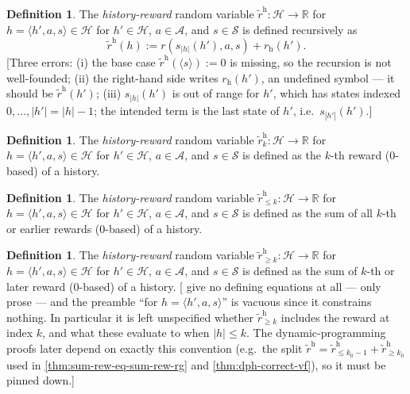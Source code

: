 \documentclass[letterpaper]{article}
\theoremstyle{plain}
\theoremstyle{definition}
\newtheorem{definition}[theorem]{Definition}
\theoremstyle{remark}
\newcommand{\Real}{\mathbb{R}}
\newcommand{\rew}{\tilde{r}^{\mathrm{h}}}
\newcommand{\cc}[1]{\textcolor{ccolor}{[#1]}}
\newcommand{\lean}[1]{\textcolor{blue}{(\emph{LEAN}: \texttt{#1})}}
\newcommand{\leanok}{}
\begin{document}
\begin{definition} \label{def:reward}
The \emph{history-reward} random variable $\rew\colon \mathcal{H} \to \Real$ for $h = \langle h', a, s \rangle \in  \mathcal{H}$ for $h'\in \mathcal{H}$, $a\in \mathcal{A}$, and $s\in \mathcal{S}$ is defined recursively as
\[
\rew(h) := r(s_{|h|}(h'), a, s) + r_{\mathrm{h}}(h').
\]
\cc{Three errors: (i) the base case $\rew(\langle s \rangle) := 0$ is missing, so the recursion is not well-founded; (ii) the right-hand side writes $r_{\mathrm{h}}(h')$, an undefined symbol --- it should be $\rew(h')$; (iii) $s_{|h|}(h')$ is out of range for $h'$, which has states indexed $0,\dots,|h'| = |h|-1$; the intended term is the last state of $h'$, i.e.\ $s_{|h'|}(h')$.}
\end{definition}

\begin{definition}\label{reward_at}
The \emph{history-reward} random variable $\rew_k \colon \mathcal{H} \to \Real$ for $h = \langle h', a, s \rangle \in  \mathcal{H}$ for $h'\in \mathcal{H}$, $a\in \mathcal{A}$, and $s\in \mathcal{S}$ is defined as the $k$-th reward (0-based) of a history.
\end{definition}

\begin{definition}\label{reward_to}
The \emph{history-reward} random variable $\rew_{\le k} \colon \mathcal{H} \to \Real$ for $h = \langle h', a, s \rangle \in  \mathcal{H}$ for $h'\in \mathcal{H}$, $a\in \mathcal{A}$, and $s\in \mathcal{S}$ is defined as the sum of all $k$-th or earlier rewards (0-based) of a history.
\end{definition}

\begin{definition}\label{reward_from}
The \emph{history-reward} random variable $\rew_{\ge k}\colon \mathcal{H} \to \Real$ for $h = \langle h', a, s \rangle \in  \mathcal{H}$ for $h'\in \mathcal{H}$, $a\in \mathcal{A}$, and $s\in \mathcal{S}$ is defined as the sum of $k$-th or later reward (0-based) of a history.
\cc{ give no defining equations at all --- only prose --- and the preamble ``for $h=\langle h',a,s\rangle$'' is vacuous since it constrains nothing. In particular it is left unspecified whether $\rew_{\ge k}$ includes the reward at index $k$, and what these evaluate to when $|h| \le k$. The dynamic-programming proofs later depend on exactly this convention (e.g.\ the split $\rew = \rew_{\le k_0-1} + \rew_{\ge k_0}$ used in \cref{thm:sum-rew-eq-sum-rew-rg} and \cref{thm:dph-correct-vf}), so it must be pinned down.}
\end{definition}
\end{document}
